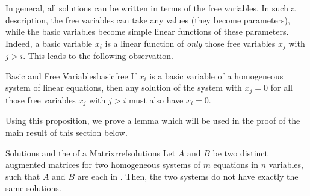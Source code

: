 In general, all solutions can be written in terms of the free variables. In such a description, the free variables can take any values (they become parameters), while the basic variables become simple linear functions of these parameters. Indeed, a basic variable $x_i$ is a linear function of {\em only \em}those free variables $x_j$ with $j>i$. This leads to the following observation.

\begin{proposition}{Basic and Free Variables}{basicfree}
If $x_i$ is a basic variable of a homogeneous system of linear equations, then any solution of the system with $x_j=0$ for all those free variables $x_j$ with $j>i$ must also have $x_i=0$.
\end{proposition}

Using this proposition, we prove a lemma which will be used in the proof of the main result of this section below.

\begin{lemma}{Solutions and the {\RREF} of a Matrix}{rrefsolutions}
Let $A$ and $B$ be two distinct augmented matrices for two homogeneous systems of $m$ equations in $n$ variables, such that $A$ and $B$ are each in {\rref}. Then, the two systems do not have exactly the same solutions.
\end{lemma}

